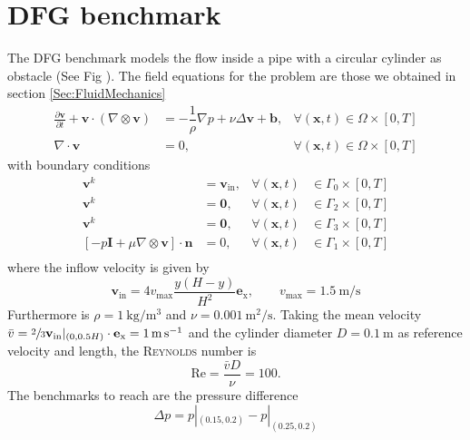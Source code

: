 \documentclass[]{scrartcl}
\newcommand{\pfrac}[2]{\frac{\partial #1}{\partial #2}}
\begin{document}
\section{DFG benchmark}
The DFG benchmark models the flow inside a pipe with a circular cylinder as obstacle (See Fig ). The field equations for the problem are those we obtained in section \ref{Sec:FluidMechanics}
\begin{equation*}
\begin{aligned}
\pfrac{\mathbf{v}}{t} + \mathbf{v} \cdot (\nabla \otimes \mathbf{v})&=  - \dfrac{1}{\rho}\nabla p + \nu \Delta \mathbf{v} + \mathbf{b}, &\forall (\mathbf{x}, t) \in \Omega \times \left[0, T \right] \\
\nabla \cdot \mathbf{v}&= 0, &\forall (\mathbf{x}, t) \in \Omega \times  \left[0, T \right]
\end{aligned}
\end{equation*}
with boundary conditions
\begin{equation*}
\begin{aligned}
\mathbf{v}^{k} &= \mathbf{v}_\textrm{in},  &\forall(\mathbf{x}, t) &\in \Gamma_0 \times [0, T] \\
\mathbf{v}^{k} &= \mathbf{0}, &\forall(\mathbf{x}, t) &\in \Gamma_2 \times [0,T]\\
\mathbf{v}^{k} &= \mathbf{0}, &\forall(\mathbf{x}, t) &\in \Gamma_3 \times [0, T] \\
[-p\mathbf{I} + \mu \nabla \otimes \mathbf{v}] \cdot \mathbf{n} &=0, &\forall(\mathbf{x}, t) &\in \Gamma_1 \times [0, T] \\
\end{aligned}
\end{equation*}
where the inflow velocity is given by
\begin{equation*}
	\mathbf{v}_\textrm{in} = 4v_\textrm{max}\dfrac{y(H-y)}{H^2}\mathbf{e}_\textrm{x},
	\qquad
	v_\textrm{max} = \SI{1.5}{\meter\per\second}
\end{equation*}
Furthermore is $\rho = \SI{1}{\kilogram\per\meter^3}$ and $\nu = \SI{0.001}{\meter^2\per\second}$. Taking the mean velocity $\bar{v} = \sfrac{2}{3} \mathbf{v}_\textrm{in}|_{(0,0.5H)} \cdot \mathbf{e}_\textrm{x} =  \SI{1}{\meter\per\second} $ and the cylinder diameter $D= \SI{0.1}{\meter}$ as reference velocity and length, the \textsc{Reynolds} number is
\begin{equation*}
	\textrm{Re} = \dfrac{\bar{v}D}{\nu} = 100.
\end{equation*}
The benchmarks to reach are the pressure difference
\begin{equation*}
	\Delta p = p|_{(0.15,0.2)} - p|_{(0.25,0.2)}
\end{equation*}
\end{document}
